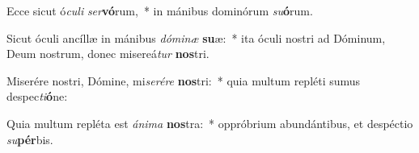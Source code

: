 \item Ecce sicut ó\textit{cu}\textit{li} \textit{ser}\textbf{vó}rum,~* in mánibus dominórum \textit{su}\textbf{ó}rum.
\item Sicut óculi ancíllæ in mánibus \textit{dó}\textit{mi}\textit{næ} \textbf{su}æ:~* ita óculi nostri ad Dóminum, Deum nostrum, donec misereá\textit{tur} \textbf{nos}tri.
\item Miserére nostri, Dómine, mi\textit{se}\textit{ré}\textit{re} \textbf{nos}tri:~* quia multum repléti sumus despec\textit{ti}\textbf{ó}ne:
\item Quia multum repléta est \textit{á}\textit{ni}\textit{ma} \textbf{nos}tra:~* oppróbrium abundántibus, et despéctio \textit{su}\textbf{pér}bis.
